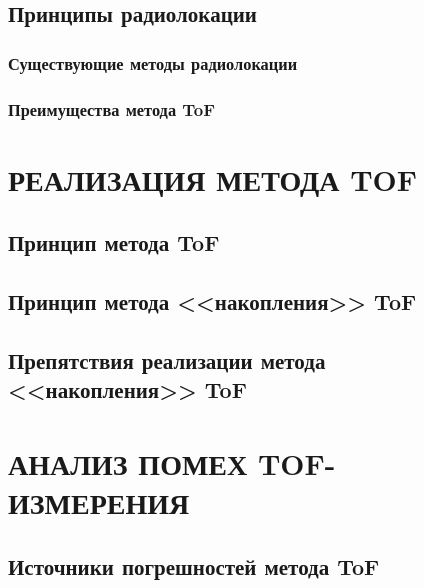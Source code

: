     \subsection{Принципы радиолокации}
    

        \subsubsection{Существующие методы радиолокации}
        

        \subsubsection{Преимущества метода ToF}
        

\section{РЕАЛИЗАЦИЯ МЕТОДА TOF}

    \subsection{Принцип метода ToF}
    

    \subsection{Принцип метода <<накопления>> ToF}
    \label{sec:accumulation}
    

    \subsection{Препятствия реализации метода <<накопления>> ToF}
    

\section{АНАЛИЗ ПОМЕХ TOF-ИЗМЕРЕНИЯ}

    \subsection{Источники погрешностей метода ToF}
    \label{sec:error}
    
    
